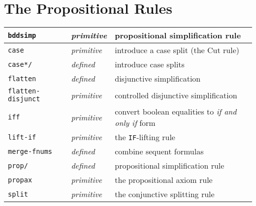 \documentclass[12pt]{book}
\makeatletter
\newcommand{\indtt}[1]{\texttt{#1}\index{#1@{\texttt{#1}}}}  %
\newcommand{\indttdol}[1]{\texttt{#1/\char36}\index{#1@{\texttt{#1}}}} %
\makeatother
\begin{document}
\section{The Propositional Rules}

\begin{tabularx}{\textwidth}{|l|l|X|}\hline
\indtt{bddsimp} & \emph{primitive} & propositional simplification rule\\\hline
\indtt{case} & \emph{primitive} & introduce a case split (the Cut rule)\\\hline
\indttdol{case*} & \emph{defined} & introduce case splits \\\hline
\indtt{flatten} & \emph{defined} & disjunctive simplification\\\hline
\indtt{flatten-disjunct} & \emph{primitive} & controlled disjunctive simplification\\\hline
\indtt{iff} & \emph{primitive} & convert boolean equalities to \emph{if and only if} form\\\hline
\indtt{lift-if} & \emph{primitive} & the \texttt{IF}-lifting rule \\\hline
\indtt{merge-fnums} & \emph{defined} & combine sequent formulas\\\hline
\indttdol{prop} & \emph{defined} & propositional simplification rule \\\hline
\indtt{propax} & \emph{primitive} & the propositional axiom rule\\\hline
\indtt{split} & \emph{primitive} & the conjunctive splitting rule\\\hline
\end{tabularx}
\end{document}
